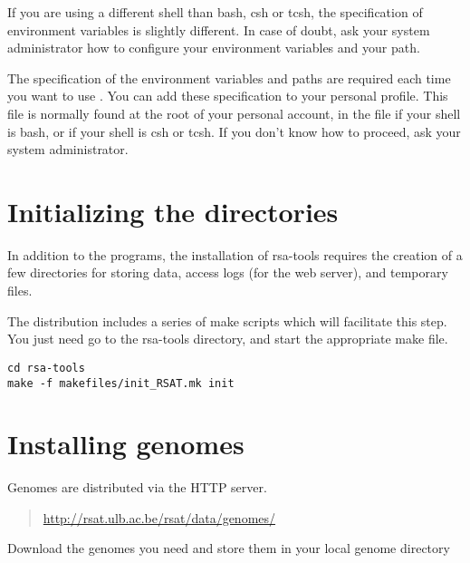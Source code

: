\documentclass{article}
\begin{document}
If you are using a different shell than bash, csh or tcsh, the
specification of environment variables is slightly different.  In case
of doubt, ask your system administrator how to configure your
environment variables and your path.

The specification of the environment variables and paths are required
each time you want to use \RSAT. You can add these specification to
your personal profile.  This file is normally found at the root of
your personal account, in the file  if your shell is
bash, or  if your shell is csh or tcsh. If you don't know
how to proceed, ask your system administrator.



\section{Initializing the directories}

In addition to the programs, the installation of rsa-tools requires
the creation of a few directories for storing data, access logs (for
the web server), and temporary files.  

The distribution includes a series of make scripts which will
facilitate this step. You just need go to the rsa-tools directory, and
start the appropriate make file.

\begin{verbatim}
cd rsa-tools
make -f makefiles/init_RSAT.mk init
\end{verbatim}


\section{Installing genomes}

Genomes are distributed via the HTTP server. 

\begin{quote}
\url{http://rsat.ulb.ac.be/rsat/data/genomes/}
\end{quote}

Download the genomes you need and store them in your local \RSAT
genome directory

\begin{quote}
\end{quote}
\end{document}
